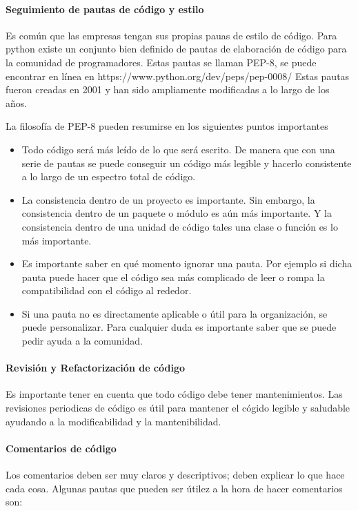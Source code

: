 \paragraph{Seguimiento de pautas de código y estilo} Es común que las empresas tengan sus propias pauas de estilo de código. Para python existe un conjunto bien definido de pautas de elaboración de código para la comunidad de programadores. Estas pautas se llaman PEP-8, se puede encontrar en línea en https://www.python.org/dev/peps/pep-0008/
Estas pautas fueron creadas en 2001 y han sido ampliamente modificadas a lo largo de los años. 

La filosofía de PEP-8 pueden resumirse en los siguientes puntos importantes

\begin{itemize}
    \item Todo código será más leído de lo que será escrito. De manera que con una serie de pautas se puede conseguir un código más legible y hacerlo consistente a lo largo de un espectro total de código.
    \item La consistencia dentro de un proyecto es importante. Sin embargo, la consistencia dentro de un paquete o módulo es aún más importante. Y la consistencia dentro de una unidad de código tales una clase o función es lo más importante.
    \item Es importante saber en qué momento ignorar una pauta. Por ejemplo si dicha pauta puede hacer que el código sea más complicado de leer o rompa la compatibilidad con el código al rededor.
    \item Si una pauta no es directamente aplicable o útil para la organización, se puede personalizar. Para cualquier duda es importante saber que se puede pedir ayuda a la comunidad. 
\end{itemize}

\paragraph{Revisión y Refactorización de código} Es importante tener en cuenta que todo código debe tener mantenimientos. Las revisiones periodicas de código es útil para mantener el cógido legible y saludable ayudando a la modificabilidad y la mantenibilidad. 

\paragraph{Comentarios de código} Los comentarios deben ser muy claros y descriptivos; deben explicar lo que hace cada cosa. Algunas pautas que pueden ser útilez a la hora de hacer comentarios son:

